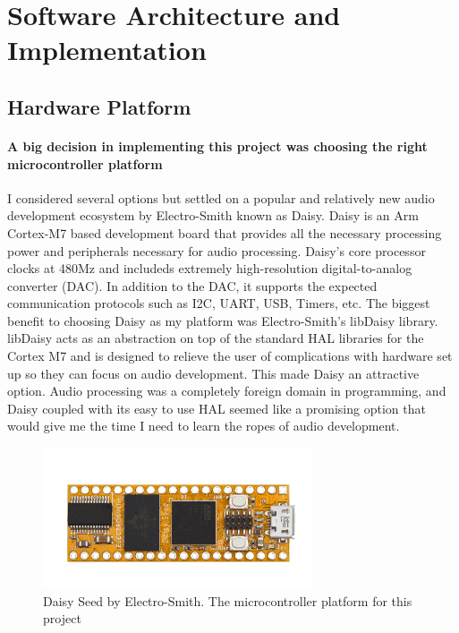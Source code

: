 \documentclass[acmlarge,screen]{acmart}
\begin{document}
\section{Software Architecture and Implementation}

\subsection{Hardware Platform}
	\paragraph{A big decision in implementing this project was choosing the right microcontroller platform} I considered several options but settled on a popular and relatively new audio development ecosystem by Electro-Smith known as Daisy. Daisy is an Arm Cortex-M7 based development board that provides all the necessary processing power and peripherals necessary for audio processing. Daisy's core processor clocks at 480Mz and includeds extremely high-resolution digital-to-analog converter (DAC). In addition to the DAC, it supports the expected communication protocols such as I2C, UART, USB, Timers, etc. The biggest benefit to choosing Daisy as my platform was Electro-Smith's libDaisy library. libDaisy acts as an abstraction on top of the standard HAL libraries for the Cortex M7 and is designed to relieve the user of complications with hardware set up so they can focus on audio development. This made Daisy an attractive option. Audio processing was a completely foreign domain in programming, and Daisy coupled with its easy to use HAL seemed like a promising option that would give me the time I need to learn the ropes of audio development.
	
	\begin{figure}[H]
		\includegraphics[width=8cm]{daisy_promo_pic}
		\caption{Daisy Seed by Electro-Smith. The microcontroller platform for this project}
		\centering
	\end{figure}
\end{document}
